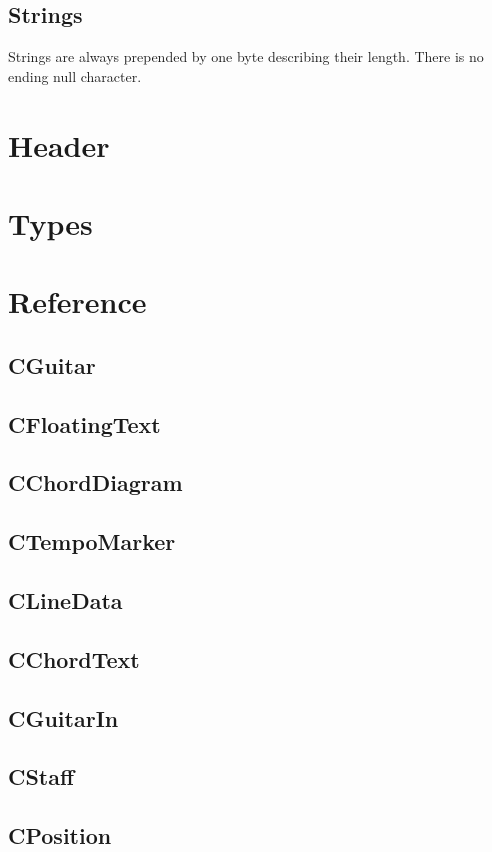 \documentclass[a4paper]{article}
\begin{document}
\subsection{Strings}

Strings are always prepended by one byte describing their length. There is 
no ending null character.

\section{Header}

\section{Types}

\section{Reference}

\subsection{CGuitar}
\subsection{CFloatingText}
\subsection{CChordDiagram}
\subsection{CTempoMarker}
\subsection{CLineData}
\subsection{CChordText}
\subsection{CGuitarIn}
\subsection{CStaff}
\subsection{CPosition}
\end{document}
